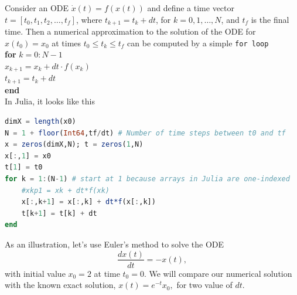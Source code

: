  \vspace*{.5cm}
\begin{tcolorbox}[title={\large \textbf{Euler's Method}}]
Consider an ODE $\dot{x}(t) = f(x(t))$ and define a time vector $t=[t_0, t_1, t_2, \ldots, t_f]$, where $t_{k+1} = t_k + dt$, for $k = 0, 1, \ldots, N$, and $t_f$ is the final time. Then a numerical approximation to the solution of the ODE for $x(t_0) = x_0$ at times $ t_0\le t_k \le t_f$ can be computed by a simple \texttt{for\,loop}\\

\textbf{for} $k = 0:N-1$\\
\hspace*{.4cm} $x_{k+1} = x_k + dt \cdot f(x_k)$\\
\hspace*{.4cm} $t_{k+1} = t_k + dt$\\
\textbf{end}\\

In Julia, it looks like this
\begin{lstlisting}[language=Julia,style=mystyle]
dimX = length(x0)
N = 1 + floor(Int64,tf/dt) # Number of time steps between t0 and tf
x = zeros(dimX,N); t = zeros(1,N)
x[:,1] = x0 
t[1] = t0
for k = 1:(N-1) # start at 1 because arrays in Julia are one-indexed 
    #xkp1 = xk + dt*f(xk)
    x[:,k+1] = x[:,k] + dt*f(x[:,k])
    t[k+1] = t[k] + dt
end
\end{lstlisting}
 \end{tcolorbox}
 

As an illustration, let's use Euler's method to solve the ODE 
\begin{equation}
\boxed{
    \frac{dx(t)}{dt} = -x(t),
    }
\end{equation}
with initial value $x_0 = 2$ at time $t_0 = 0$. We will compare our numerical solution with the known exact solution, $x(t) = e^{-t} x_0,$ for two value of $dt$.

